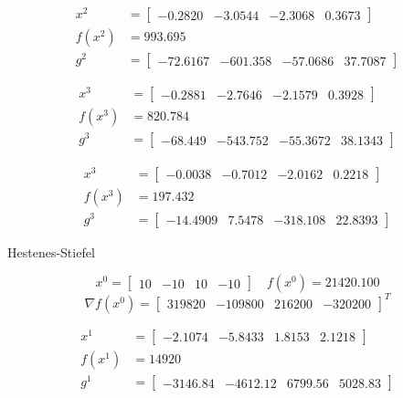 \documentclass[12pt]{article}
\begin{document}

\begin{align*}
    x^2 &= \begin{bmatrix}
        -0.2820 & -3.0544 & -2.3068 & 0.3673
    \end{bmatrix} \\
    f(x^2) &= 993.695\\
    g^2 &= \begin{bmatrix}
        -72.6167 & -601.358 & -57.0686 & 37.7087
    \end{bmatrix}
\end{align*}


\begin{align*}
    x^3 &= \begin{bmatrix}
        -0.2881 & -2.7646 & -2.1579 & 0.3928
    \end{bmatrix} \\
    f(x^3) &= 820.784\\
    g^3 &= \begin{bmatrix}
        -68.449 & -543.752 & -55.3672 & 38.1343
    \end{bmatrix}
\end{align*}


\begin{align*}
    x^3 &= \begin{bmatrix}
        -0.0038 & -0.7012 & -2.0162 & 0.2218
    \end{bmatrix} \\
    f(x^3) &= 197.432\\
    g^3 &= \begin{bmatrix}
        -14.4909 & 7.5478 & -318.108 & 22.8393
    \end{bmatrix}
\end{align*}

Hestenes-Stiefel

\[x^0 = \begin{bmatrix}
    10 &-10 & 10 & -10
\end{bmatrix} \quad f(x^0) = 21420.100\]
\[\nabla f(x^0) = \begin{bmatrix}
    319820 & -109800 & 216200 & -320200
\end{bmatrix}^T\]


\begin{align*}
    x^1 &= \begin{bmatrix}
        -2.1074 & -5.8433 & 1.8153 & 2.1218
    \end{bmatrix} \\
    f(x^1) &= 14920\\
    g^1 &= \begin{bmatrix}
        -3146.84 & -4612.12 & 6799.56 & 5028.83
    \end{bmatrix}
\end{align*}
\end{document}
